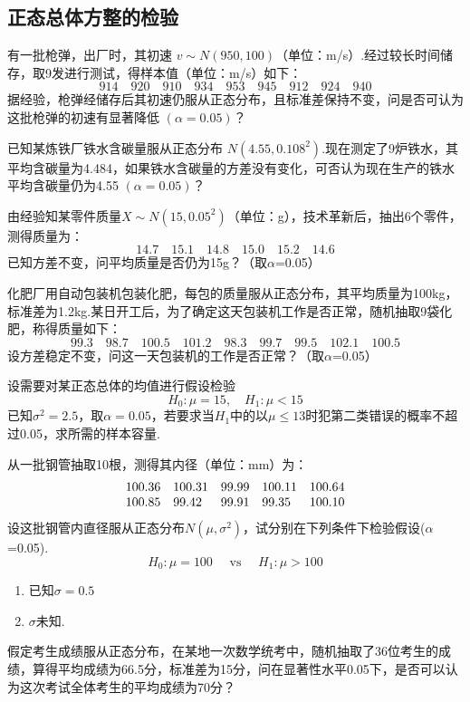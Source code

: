 \subsection{正态总体方整的检验\label{7.2.3}}

\begin{xiti}
	\item 有一批枪弹，出厂时，其初速 $v\sim N(950,100)$（单位：m/s）.经过较长时间储存，取9发进行测试，得样本值（单位：m/s）如下：
	\[914 \quad 920 \quad 910 \quad 934 \quad 953 \quad 945 \quad 912 \quad 924 \quad 940\]
	据经验，枪弹经储存后其初速仍服从正态分布，且标准差保持不变，问是否可认为这批枪弹的初速有显著降低 $(\alpha=0.05)$？
		
	\item 已知某炼铁厂铁水含碳量服从正态分布 $N(4.55,0.108^{{2}})$.现在测定了9炉铁水，其平均含碳量为4.484，如果铁水含碳量的方差没有变化，可否认为现在生产的铁水平均含碳量仍为4.55 $(\alpha=0.05)$？
	
	
	\item 由经验知某零件质量$X \sim N \left( 15,0.05 ^ { 2 } \right)$（单位：g），技术革新后，抽出6个零件，测得质量为：
	\[14.7 \quad 15.1 \quad 14.8 \quad 15.0 \quad 15.2 \quad 14.6\]
	已知方差不变，问平均质量是否仍为15g？（取$\alpha$=0.05）
	
	
	\item 化肥厂用自动包装机包装化肥，每包的质量服从正态分布，其平均质量为100kg，标准差为1.2kg.某日开工后，为了确定这天包装机工作是否正常，随机抽取9袋化肥，称得质量如下：
	\[99.3 \quad 98.7 \quad 100.5 \quad 101.2 \quad 98.3 \quad 99.7 \quad 99.5 \quad 102.1 \quad 100.5\]
	设方差稳定不变，问这一天包装机的工作是否正常？（取$\alpha$=0.05）
	
	
	\item 设需要对某正态总体的均值进行假设检验
	\[H _ { 0 } : \mu = 15 , \quad H _ { 1 } : \mu < 15\]
	已知$\sigma^{2}=2.5$，取$\alpha=0.05$，若要求当$H_{1}$中的以$\mu \leq 13$时犯第二类错误的概率不超过0.05，求所需的样本容量.
	
	
	\item 从一批钢管抽取10根，测得其内径（单位：mm）为：
	\[\begin{array} { l l l l l } { 100.36 } & { 100.31 } & { 99.99 } & { 100.11 } & { 100.64 } \\ { 100.85 } & { 99.42 } & { 99.91 } & { 99.35 } & { 100.10 } \end{array}\]
	设这批钢管内直径服从正态分布$N(\mu ,\sigma^{2})$，试分别在下列条件下检验假设($\alpha$=0.05).
	\[H _ { 0 } : \mu = 100 \quad \text { vs } \quad H _ { 1 } : \mu > 100\]
	\begin{enumerate}
		\item 已知$\sigma=0.5$
		\item $\sigma$未知.
	\end{enumerate}
	\item 假定考生成绩服从正态分布，在某地一次数学统考中，随机抽取了36位考生的成绩，算得平均成绩为66.5分，标准差为15分，问在显著性水平0.05下，是否可以认为这次考试全体考生的平均成绩为70分？
	

\end{xiti}
